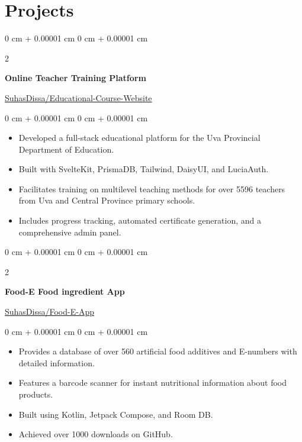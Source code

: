 \documentclass[10pt, letterpaper]{article}
\newenvironment{highlights}{
	\begin{itemize}[
		topsep=0.10 cm,
		parsep=0.10 cm,
		partopsep=0pt,
		itemsep=0pt,
		leftmargin=0 cm + 10pt
		]
	}{
	\end{itemize}
} %
\newenvironment{onecolentry}{
	\begin{adjustwidth}{
			0 cm + 0.00001 cm
		}{
			0 cm + 0.00001 cm
		}
	}{
	\end{adjustwidth}
} %
\newenvironment{twocolentry}[2][]{
	\onecolentry
	\def\secondColumn{#2}
	\setcolumnwidth{\fill, 4.5 cm}
	\begin{paracol}{2}
	}{
		\switchcolumn \raggedleft \secondColumn
	\end{paracol}
	\endonecolentry
} %
\begin{document}
	\section{Projects}
	\begin{twocolentry}{\href{https://github.com/SuhasDissa/Educational-Course-Website}{SuhasDissa/Educational-Course-Website}}
		\textbf{Online Teacher Training Platform}
	\end{twocolentry}
	\vspace{0.10 cm}
	\begin{onecolentry}
		\begin{highlights}
			\item Developed a full-stack educational platform for the Uva Provincial Department of Education.
			\item Built with SvelteKit, PrismaDB, Tailwind, DaisyUI, and LuciaAuth.
			\item Facilitates training on multilevel teaching methods for over 5596 teachers from Uva and Central Province primary schools.
			\item Includes progress tracking, automated certificate generation, and a comprehensive admin panel.
		\end{highlights}
	\end{onecolentry}
	
	
	\vspace{0.2 cm}
	
	\begin{twocolentry}{\href{https://github.com/SuhasDissa/Food-E-App}{SuhasDissa/Food-E-App}}
		\textbf{Food-E Food ingredient App}
	\end{twocolentry}
	\vspace{0.10 cm}
	\begin{onecolentry}
		\begin{highlights}
			\item Provides a database of over 560 artificial food additives and E-numbers with detailed information.
			\item Features a barcode scanner for instant nutritional information about food products.
			\item Built using Kotlin, Jetpack Compose, and Room DB.
			\item Achieved over 1000 downloads on GitHub.
		\end{highlights}
	\end{onecolentry}
	
	\vspace{0.2 cm}
	
\end{document}
